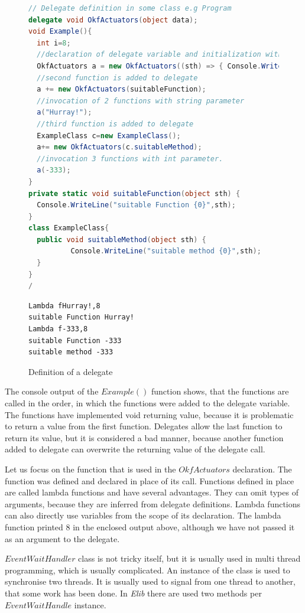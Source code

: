 \begin{figure}[!hbp]
\begin{lstlisting}[language=cs]
// Delegate definition in some class e.g Program
delegate void OkfActuators(object data);
void Example(){
  int i=8;
  //declaration of delegate variable and initialization with lambda function
  OkfActuators a = new OkfActuators((sth) => { Console.WriteLine("Lambda f{0},{1}",sth,i); });
  //second function is added to delegate
  a += new OkfActuators(suitableFunction);
  //invocation of 2 functions with string parameter
  a("Hurray!");
  //third function is added to delegate
  ExampleClass c=new ExampleClass();
  a+= new OkfActuators(c.suitableMethod);
  //invocation 3 functions with int parameter.
  a(-333);
}
private static void suitableFunction(object sth) { 
  Console.WriteLine("suitable Function {0}",sth);
}
class ExampleClass{
  public void suitableMethod(object sth) { 	
          Console.WriteLine("suitable method {0}",sth);	
  }
}
/\end{lstlisting}
\caption{Definition of a delegate} \label{deleg}

\begin{verbatim}
Lambda fHurray!,8
suitable Function Hurray!
Lambda f-333,8
suitable Function -333
suitable method -333
\end{verbatim}
\end{figure}
  The console output of the $Example()$ function shows, 
  that the functions are called in the order, 
  in  which the functions were added to the delegate variable. 
  The functions have implemented void returning value, 
  because it is problematic to return a value from the first function. 
  Delegates allow the last function to return its value, 
  but it is considered a bad manner, because
  another function added to delegate can overwrite the returning value of the delegate call.

  Let us focus on the function that is used in the $OkfActuators$ declaration. The function 
  was defined and declared in place of its call. 
  Functions defined in place are called lambda functions 
  and have several advantages. 
  They can omit types of arguments, because they are inferred from delegate definitions. Lambda functions
  can also directly use variables from the scope of its declaration. 
  The lambda function printed $8$ in the enclosed output above,
  although we have not passed it as an argument to the delegate.

  \begin{definition}[$EventWaitHandle$]
  $EventWaitHandler$ class is not tricky itself, 
  but it is usually used in multi thread programming, which is usually complicated.
  An instance of the class is used to synchronise two threads. 
  It is usually used to signal from one thread to another, 
  that some work has been done. In {\it Elib} there are used two 
  methods per~$EventWaitHandle$ instance.
  \end{definition}

